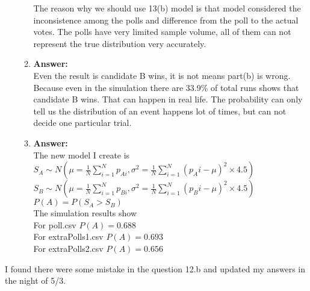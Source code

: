 \documentclass{article}
\newcommand{\myansw}{\textbf{Answer:}\\}
\begin{document}
\begin{enumerate}
\begin{enumerate}
		The reason why we should use 13(b) model is that model considered the inconsistence among the polls and difference from the poll to the actual votes. The polls have very limited sample volume, all of them can not represent the true distribution very accurately.
		\item
		\myansw
		Even the result is candidate B wins, it is not means part(b) is wrong. Because even in the simulation there are 33.9\% of total runs shows that candidate B wins. That can happen in real life.
		The probability can only tell us the distribution of an event happens lot of times, but can not decide one particular trial.
		\item
		\myansw
		The new model I create is\\
		${S_A \sim N(\mu = \frac{1}{N}\sum\limits_{i=1}^N p_{Ai}, \sigma^2  = \frac{1}{N} \sum\limits_{i = 1}^N (p_Ai - \mu)^2\times 4.5)}$\\
		${S_B \sim N(\mu = \frac{1}{N}\sum\limits_{i=1}^N p_{Bi}, \sigma^2  = \frac{1}{N} \sum\limits_{i = 1}^N (p_Bi - \mu)^2\times 4.5)}$\\
		${P(A) = P(S_A > S_B)}$\\
		The simulation results show\\
		For poll.csv ${P(A) = 0.688}$\\
		For extraPolls1.csv ${P(A) = 0.693}$\\
		For extraPolls2.csv ${P(A) = 0.656}$\\
		
		
		
	\end{enumerate}

\end{enumerate}

\newpage
I found there were some mistake in the question 12.b and updated my answers in the night of 5/3.
\end{document}
